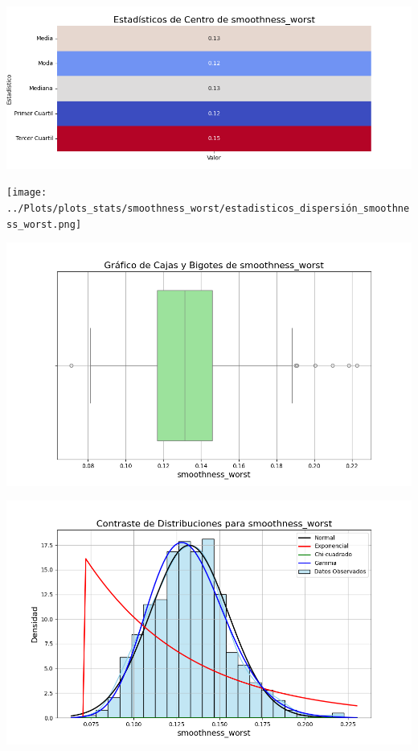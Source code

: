 \documentclass[a4paper, 12pt]{article}
\begin{document}
\includegraphics[width=\textwidth]{../Plots/plots_stats/smoothness_worst/estadisticas_centro_smoothness_worst.png}




\texttt{[image: ../Plots/plots\_stats/smoothness\_worst/estadisticos\_dispersión\_smoothness\_worst.png]}



\includegraphics[width=\textwidth]{../Plots/plots_stats/smoothness_worst/boxplot_smoothness_worst.png}




\includegraphics[width=\textwidth]{../Plots/plots_stats/smoothness_worst/distribuciones_conocidas_smoothness_worst.png}
\end{document}
